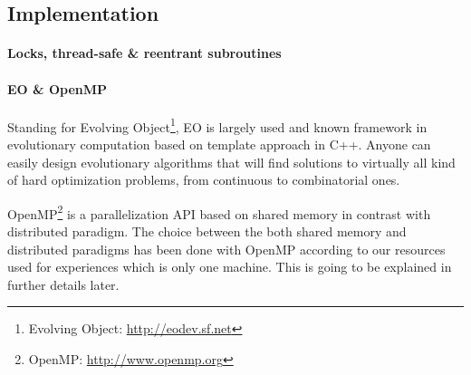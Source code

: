 \documentclass{sig-alternate}
\begin{document}



\subsection{Implementation}

\paragraph{Locks, thread-safe \& reentrant subroutines} %

\paragraph{EO \& OpenMP} %


Standing for Evolving Object\footnote{Evolving Object: \url{http://eodev.sf.net}}, EO is largely used and known framework in evolutionary computation based on template approach in C++. Anyone can easily design evolutionary algorithms that will find solutions to virtually all kind of hard optimization problems, from continuous to combinatorial ones.


OpenMP\footnote{OpenMP: \url{http://www.openmp.org}} is a parallelization API based on shared memory in contrast with distributed paradigm. The choice between the both shared memory and distributed paradigms has been done with OpenMP according to our resources used for experiences which is only one machine. This is going to be explained in further details later.
\end{document}
